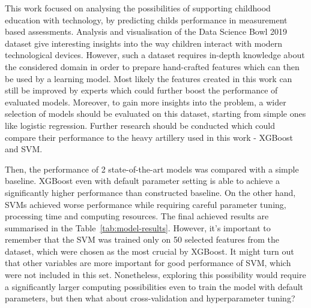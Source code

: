 \documentclass[fleqn,10pt]{SelfArx} %
\begin{document}
This work focused on analysing the possibilities of supporting childhood education with technology, by predicting childs performance in measurement based assessments.
Analysis and visualisation of the Data Science Bowl 2019 dataset give interesting insights into the way children interact with modern technological devices.
However, such a dataset requires in-depth knowledge about the considered domain in order to prepare hand-crafted features which can then be used by a learning model.
Most likely the features created in this work can still be improved by experts which could further boost the performance of evaluated models.
Moreover, to gain more insights into the problem, a wider selection of models should be evaluated on this dataset, starting from simple ones like logistic regression.
Further research should be conducted which could compare their performance to the heavy artillery used in this work - XGBoost and SVM.

Then, the performance of 2 state-of-the-art models was compared with a simple baseline.
XGBoost even with default parameter setting is able to achieve a significantly higher performance than constructed baseline.
On the other hand, SVMs achieved worse performance while requiring careful parameter tuning, processing time and computing resources.
The final achieved results are summarised in the Table~\ref{tab:model-results}.
However, it's important to remember that the SVM was trained only on 50 selected features from the dataset, which were chosen as the most crucial by XGBoost.
It might turn out that other variables are more important for good performance of SVM, which were not included in this set.
Nonetheless, exploring this possibility would require a significantly larger computing possibilities even to train the model with default parameters, but then what about cross-validation and hyperparameter tuning?




\end{document}
